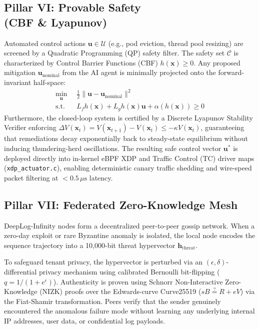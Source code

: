 \documentclass[letterpaper,twocolumn,10pt]{article}
\begin{document}
\subsection[Pillar VI: Provable Safety (CBF and Lyapunov)]{Pillar VI: Provable Safety\\(CBF \& Lyapunov)}
Automated control actions $\mathbf{u} \in \mathcal{U}$ (e.g., pod eviction, thread pool resizing) are screened by a Quadratic Programming (QP) safety filter. The safety set $\mathcal{C}$ is characterized by Control Barrier Functions (CBF) $h(\mathbf{x}) \ge 0$. Any proposed mitigation $\mathbf{u}_{\text{nominal}}$ from the AI agent is minimally projected onto the forward-invariant half-space:
\begin{equation}
\label{eq:cbf_qp}
\begin{split}
\min_{\mathbf{u}} \;\; & \frac{1}{2}\|\mathbf{u} - \mathbf{u}_{\text{nominal}}\|^2 \\
\text{s.t.} \;\; & L_f h(\mathbf{x}) + L_g h(\mathbf{x})\mathbf{u} + \alpha(h(\mathbf{x})) \ge 0
\end{split}
\end{equation}
Furthermore, the closed-loop system is certified by a Discrete Lyapunov Stability Verifier enforcing $\Delta V(\mathbf{x}_t) = V(\mathbf{x}_{t+1}) - V(\mathbf{x}_t) \le -\kappa V(\mathbf{x}_t)$, guaranteeing that remediations decay exponentially back to steady-state equilibrium without inducing thundering-herd oscillations. The resulting safe control vector $\mathbf{u}^*$ is deployed directly into in-kernel eBPF XDP and Traffic Control (TC) driver maps (\texttt{xdp\_\allowbreak actuator.c}), enabling deterministic canary traffic shedding and wire-speed packet filtering at $< 0.5\,\mu\text{s}$ latency.

\subsection{Pillar VII: Federated Zero-Knowledge Mesh}
DeepLog-Infinity nodes form a decentralized peer-to-peer gossip network. When a zero-day exploit or rare Byzantine anomaly is isolated, the local node encodes the sequence trajectory into a 10,000-bit threat hypervector $\mathbf{h}_{\text{threat}}$. 

To safeguard tenant privacy, the hypervector is perturbed via an $(\epsilon, \delta)$-differential privacy mechanism using calibrated Bernoulli bit-flipping ($q = 1 / (1 + e^{\epsilon})$). Authenticity is proven using Schnorr Non-Interactive Zero-Knowledge (NIZK) proofs over the Edwards-curve Curve25519 ($s B \stackrel{?}{=} R + e V$) via the Fiat-Shamir transformation. Peers verify that the sender genuinely encountered the anomalous failure mode without learning any underlying internal IP addresses, user data, or confidential log payloads.
\end{document}
